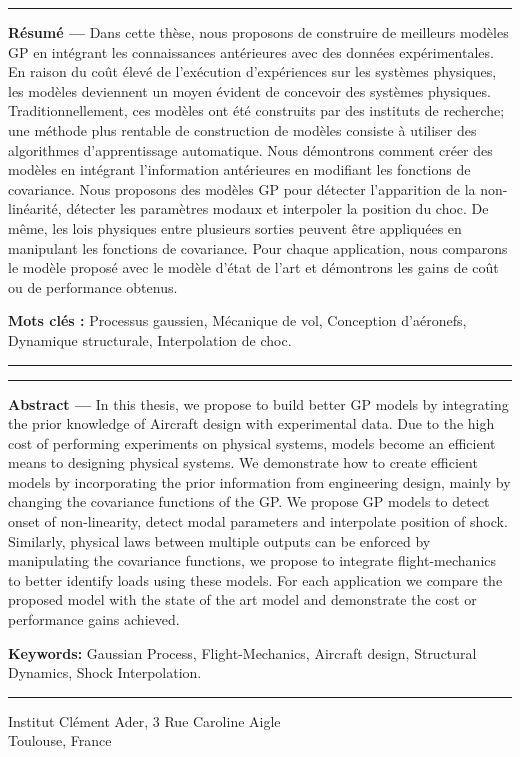 \begin{vcenterpage}

\noindent\rule[2pt]{\textwidth}{0.5pt}

{\large\textbf{Résumé ---}}
Dans cette thèse, nous proposons de construire de meilleurs modèles GP en intégrant les connaissances antérieures avec des données expérimentales. En raison du coût élevé de l'exécution d'expériences sur les systèmes physiques, les modèles deviennent un moyen évident de concevoir des systèmes physiques. Traditionnellement, ces modèles ont été construits par des instituts de recherche; une méthode plus rentable de construction de modèles consiste à utiliser des algorithmes d'apprentissage automatique. Nous démontrons comment créer des modèles en intégrant l'information antérieures en modifiant les fonctions de covariance. Nous proposons des modèles GP pour détecter l'apparition de la non-linéarité, détecter les paramètres modaux et interpoler la position du choc. De même, les lois physiques entre plusieurs sorties peuvent être appliquées en manipulant les fonctions de covariance. Pour chaque application, nous comparons le modèle proposé avec le modèle d'état de l'art et démontrons les gains de coût ou de performance obtenus.

{\large\textbf{Mots clés :}}
    Processus gaussien, Mécanique de vol, Conception d'aéronefs, Dynamique structurale, Interpolation de choc.
\\
\noindent\rule[2pt]{\textwidth}{0.5pt}

\vspace{0.5cm}

\noindent\rule[2pt]{\textwidth}{0.5pt}
{\large\textbf{Abstract ---}}
In this thesis, we propose to build better GP models by integrating the prior knowledge of Aircraft design with experimental data. Due to the high cost of performing experiments on physical systems, models become an efficient means to designing physical systems. We demonstrate how to create efficient models by incorporating the prior information from engineering design, mainly by changing the covariance functions of the GP. We propose GP models to detect onset of non-linearity, detect modal parameters and interpolate position of shock. Similarly, physical laws between multiple outputs can be enforced by manipulating the covariance functions, we propose to integrate flight-mechanics to better identify loads using these models. For each application we compare the proposed model with the state of the art model and demonstrate the cost or performance gains achieved. 

{\large\textbf{Keywords:}}
    Gaussian Process, Flight-Mechanics, Aircraft design, Structural Dynamics, Shock Interpolation.
\\
\noindent\rule[2pt]{\textwidth}{0.5pt}
\begin{center}
  Institut Cl\'ement Ader, 3 Rue Caroline Aigle\\
  Toulouse, France
\end{center}
\end{vcenterpage}

